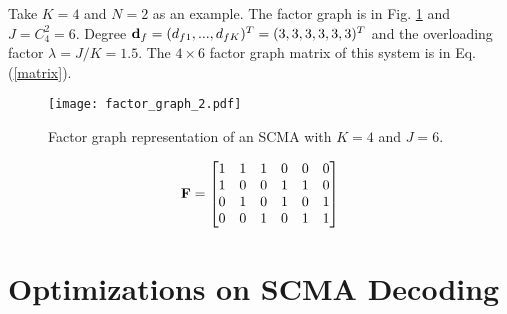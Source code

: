 \documentclass[journal,twoside]{IEEEtran}
\begin{document}
Take $K = 4$ and $N = 2$ as an example. The factor graph is in Fig. \ref{fig:fac_graph} and $J = C^{2}_{4} = 6$. Degree ${\bf{d}}_{f} = (d_{f1},...,d_{fK})^{T} = (3,3,3,3,3,3)^{T}$ and the overloading factor $\lambda = J/K = 1.5$. The $4\times6$ factor graph matrix of this system is in Eq. (\ref{matrix}).
\begin{figure}[htbp]
\centering
\texttt{[image: factor\_graph\_2.pdf]}
\caption{\label{fig:fac_graph}Factor graph representation of an SCMA with $K = 4$ and $J = 6$. }
\end{figure}
\begin{gather}\label{matrix}
{\bf{F}} =
\begin{bmatrix}
1 & 1 & 1 & 0 & 0 & 0\\
1 & 0 & 0 & 1 & 1 & 0\\
0 & 1 & 0 & 1 & 0 & 1\\
0 & 0 & 1 & 0 & 1 & 1
\end{bmatrix}
\end{gather}

\section{Optimizations on SCMA Decoding}\label{sec:Optimized}
%
\end{document}
